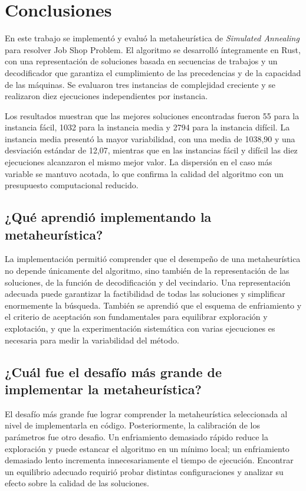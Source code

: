 \chapter{Conclusiones}
\label{ch:conclusiones}

En este trabajo se implementó y evaluó la metaheurística de \emph{Simulated Annealing}
para resolver Job Shop Problem.
El algoritmo se desarrolló íntegramente en Rust,
con una representación de soluciones basada en secuencias de trabajos y un decodificador que
garantiza el cumplimiento de las precedencias y de la capacidad de las máquinas.
Se evaluaron tres instancias de complejidad creciente y se realizaron diez ejecuciones independientes por instancia.

Los resultados muestran que las mejores soluciones encontradas fueron
55 para la instancia fácil, 1032 para la instancia media y 2794 para la instancia difícil.
La instancia media presentó la mayor variabilidad,
con una media de 1038,90 y una desviación estándar de 12,07,
mientras que en las instancias fácil y difícil las diez ejecuciones alcanzaron el mismo mejor valor.
La dispersión en el caso más variable se mantuvo acotada,
lo que confirma la calidad del algoritmo con un presupuesto computacional reducido.

\section{¿Qué aprendió implementando la metaheurística?}

La implementación permitió comprender que el desempeño de una metaheurística no depende únicamente del algoritmo,
sino también de la representación de las soluciones, de la función de decodificación y del vecindario.
Una representación adecuada puede garantizar la factibilidad de
todas las soluciones y simplificar enormemente la búsqueda.
También se aprendió que el esquema de enfriamiento y el
criterio de aceptación son fundamentales para equilibrar exploración y explotación,
y que la experimentación sistemática con varias ejecuciones es necesaria para medir la variabilidad del método.

\section{¿Cuál fue el desafío más grande de implementar la metaheurística?}

El desafío más grande fue lograr comprender la metaheurística seleccionada al nivel de implementarla en código.
Posteriormente, la calibración de los parámetros fue otro desafio.
Un enfriamiento demasiado rápido reduce la exploración y puede estancar el algoritmo en un mínimo local;
un enfriamiento demasiado lento incrementa innecesariamente el tiempo de ejecución.
Encontrar un equilibrio adecuado requirió probar distintas configuraciones y
analizar su efecto sobre la calidad de las soluciones.

